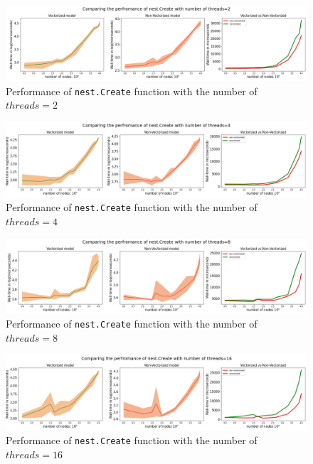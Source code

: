 \begin{figure}[ht!]
    \centering
    \includegraphics[width=\textwidth]{src/pic/thread_2.png}
    \caption{Performance of \texttt{nest.Create} function with the number of $threads=2$}
    \label{fig:threads_2}
\end{figure}

\begin{figure}[ht!]
    \centering
    \includegraphics[width=\textwidth]{src/pic/thread_4.png}
    \caption{Performance of \texttt{nest.Create} function with the number of $threads=4$}
    \label{fig:threads_4}
\end{figure}

\begin{figure}[ht!]
    \centering
    \includegraphics[width=\textwidth]{src/pic/thread_8.png}
    \caption{Performance of \texttt{nest.Create} function with the number of $threads=8$}
    \label{fig:threads_8}
\end{figure}


\begin{figure}[ht!]
    \centering
    \includegraphics[width=\textwidth]{src/pic/thread_16.png}
    \caption{Performance of \texttt{nest.Create} function with the number of $threads=16$}
    \label{fig:threads_16}
\end{figure}


